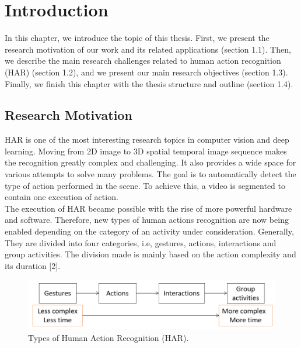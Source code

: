 
\chapter{Introduction} %
In this chapter, we introduce the topic of this thesis. First, we present the research motivation of our work and its related applications (section 1.1). Then, we describe the main research challenges related to human action recognition (HAR) (section 1.2), and we present our main research objectives (section 1.3). Finally, we finish this chapter with the thesis structure and outline (section 1.4).
\label{Chapter1} %


\newcommand{\keyword}[1]{\textbf{#1}}
\newcommand{\tabhead}[1]{\textbf{#1}}
\newcommand{\code}[1]{\texttt{#1}}
\newcommand{\file}[1]{\texttt{\bfseries#1}}
\newcommand{\option}[1]{\texttt{\itshape#1}}


\section{Research Motivation}
\hspace{5mm} HAR is one of the most interesting research topics in computer vision and deep learning. Moving from 2D image to 3D spatial temporal image sequence makes the recognition greatly complex and challenging. It also provides a wide space for various attempts to solve many problems. The goal is to automatically detect the type of action performed in the scene. To achieve this, a video is segmented to contain one execution of action.\\

The execution of HAR became possible with the rise of more powerful hardware and software. Therefore, new types of human actions recognition are now being enabled depending on the category of an activity under consideration. Generally, They are divided into four categories, i.e, gestures, actions, interactions and group activities. The division made is mainly based on the action complexity and its duration [2]. 
\begin{figure}[th]
\centering
\includegraphics{Figures/mh}
\decoRule
\caption[Types of Human Action Recognition "HAR"]{Types of Human Action Recognition (HAR).}
\label{fig:la}
\end{figure}\\

